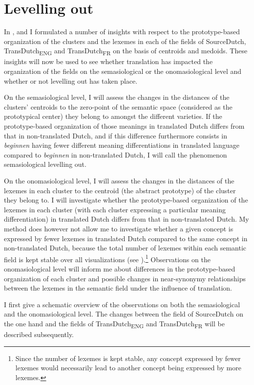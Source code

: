 \section{Levelling out}
\label{sec:4.5}  
In ,  and  I formulated a number of insights with respect to the proto\-type-based organization of the clusters and the lexemes in each of the fields of SourceDutch, TransDutch\textsubscript{ENG} and TransDutch\textsubscript{FR} on the basis of centroids and medoids. These insights will now be used to see whether translation has impacted the organization of the fields on the semasiological or the onomasiological level and whether or not levelling out has taken place.

On the semasiological level, I will assess the changes in the distances of the clusters’ centroids to the zero-point of the semantic space (considered as the prototypical center) they belong to amongst the different varieties. If the prototype-based organization of those meanings in translated Dutch differs from that in non-translated Dutch, and if this difference furthermore consists in \textit{beginnen} having fewer different meaning differentiations in translated language compared to \textit{beginnen} in non-translated Dutch, I will call the phenomenon semasiological levelling out.

On the onomasiological level, I will assess the changes in the distances of the lexemes in each cluster to the centroid (the abstract prototype) of the cluster they belong to. I will investigate whether the prototype-based organization of the lexemes in each cluster (with each cluster expressing a particular meaning differentiation) in translated Dutch differs from that in non-translated Dutch. My method does however not allow me to investigate whether a given concept is expressed by fewer lexemes in translated Dutch compared to the same concept in non-translated Dutch, because the total number of lexemes within each semantic field is kept stable over all visualizations (see ).\footnote{Since the number of lexemes is kept stable, any concept expressed by fewer lexemes would necessarily lead to another concept being expressed by more lexemes.} Observations on the onomasiological level will inform me about differences in the prototype-based organization of each cluster and possible changes in near-synonymy relationships between the lexemes in the semantic field under the influence of translation.

I first give a schematic overview of the observations on both the semasiological and the onomasiological level. The changes between the field of SourceDutch on the one hand and the fields of TransDutch\textsubscript{ENG} and TransDutch\textsubscript{FR} will be described subsequently.

